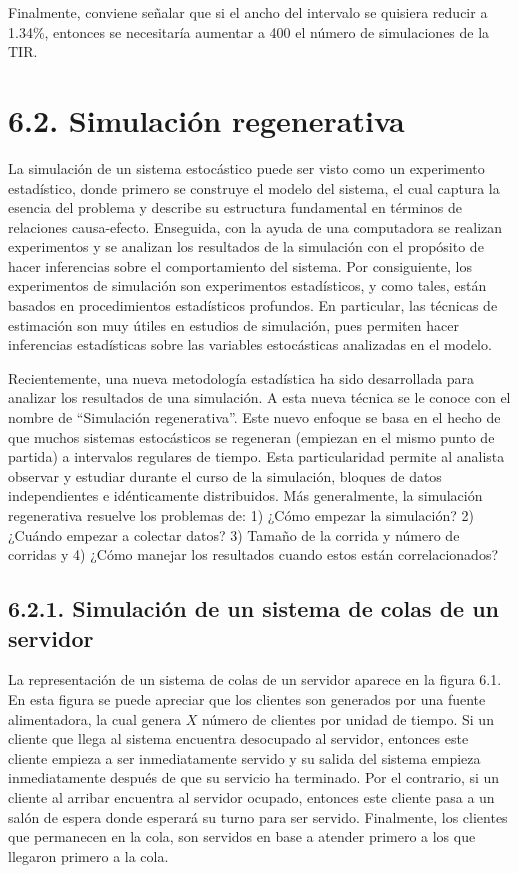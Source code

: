 \documentclass[11pt,letterpaper]{report}
\begin{document}
Finalmente, conviene señalar que si el ancho del intervalo se quisiera
reducir a 1.34\%, entonces se necesitaría aumentar a 400 el número de
simulaciones de la TIR.

\section*{6.2. Simulación regenerativa}

La simulación de un sistema estocástico puede ser visto como un
experimento estadístico, donde primero se construye el modelo del
sistema, el cual captura la esencia del problema y describe su
estructura fundamental en términos de relaciones causa-efecto. Enseguida,
con la ayuda de una computadora se realizan experimentos y se analizan
los resultados de la simulación con el propósito de hacer inferencias
sobre el comportamiento del sistema. Por consiguiente, los experimentos
de simulación son experimentos estadísticos, y como tales, están basados
en procedimientos estadísticos profundos. En particular, las técnicas de
estimación son muy útiles en estudios de simulación, pues permiten hacer
inferencias estadísticas sobre las variables estocásticas analizadas en
el modelo.

Recientemente, una nueva metodología estadística ha sido desarrollada
para analizar los resultados de una simulación. A esta nueva técnica se
le conoce con el nombre de ``Simulación regenerativa''. Este nuevo
enfoque se basa en el hecho de que muchos sistemas estocásticos se
regeneran (empiezan en el mismo punto de partida) a intervalos regulares
de tiempo. Esta particularidad permite al analista observar y estudiar
durante el curso de la simulación, bloques de datos independientes e
idénticamente distribuidos. Más generalmente, la simulación regenerativa
resuelve los problemas de: 1) ¿Cómo empezar la simulación? 2) ¿Cuándo
empezar a colectar datos? 3) Tamaño de la corrida y número de corridas y
4) ¿Cómo manejar los resultados cuando estos están correlacionados?

\subsection*{6.2.1. Simulación de un sistema de colas de un servidor}

La representación de un sistema de colas de un servidor aparece en la
figura 6.1. En esta figura se puede apreciar que los clientes son
generados por una fuente alimentadora, la cual genera $X$ número de
clientes por unidad de tiempo. Si un cliente que llega al sistema
encuentra desocupado al servidor, entonces este cliente empieza a ser
inmediatamente servido y su salida del sistema empieza inmediatamente
después de que su servicio ha terminado. Por el contrario, si un
cliente al arribar encuentra al servidor ocupado, entonces este cliente
pasa a un salón de espera donde esperará su turno para ser servido.
Finalmente, los clientes que permanecen en la cola, son servidos en base
a atender primero a los que llegaron primero a la cola.
\end{document}
